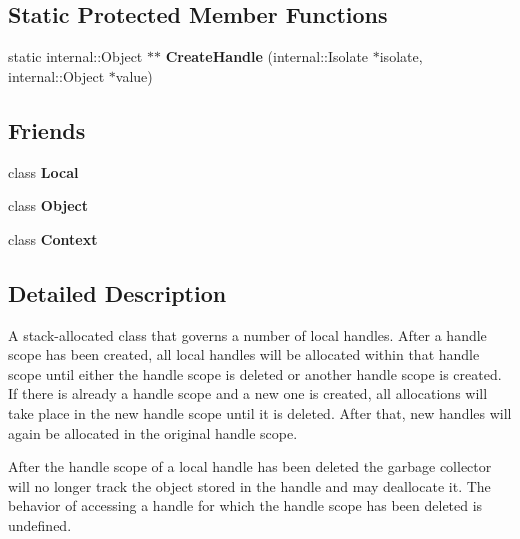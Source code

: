 \subsection*{Static Protected Member Functions}
\begin{DoxyCompactItemize}
\item 
\hypertarget{classv8_1_1HandleScope_a3f63aa8552a0371606305f58187d80e2}{static internal\-::\-Object $\ast$$\ast$ {\bfseries Create\-Handle} (internal\-::\-Isolate $\ast$isolate, internal\-::\-Object $\ast$value)}\label{classv8_1_1HandleScope_a3f63aa8552a0371606305f58187d80e2}

\end{DoxyCompactItemize}
\subsection*{Friends}
\begin{DoxyCompactItemize}
\item 
\hypertarget{classv8_1_1HandleScope_a0320da7f4056d4493dc1f8e49985d06e}{class {\bfseries Local}}\label{classv8_1_1HandleScope_a0320da7f4056d4493dc1f8e49985d06e}

\item 
\hypertarget{classv8_1_1HandleScope_a0720b5f434e636e22a3ed34f847eec57}{class {\bfseries Object}}\label{classv8_1_1HandleScope_a0720b5f434e636e22a3ed34f847eec57}

\item 
\hypertarget{classv8_1_1HandleScope_ac26c806e60ca4a0547680edb68f6e39b}{class {\bfseries Context}}\label{classv8_1_1HandleScope_ac26c806e60ca4a0547680edb68f6e39b}

\end{DoxyCompactItemize}


\subsection{Detailed Description}
A stack-\/allocated class that governs a number of local handles. After a handle scope has been created, all local handles will be allocated within that handle scope until either the handle scope is deleted or another handle scope is created. If there is already a handle scope and a new one is created, all allocations will take place in the new handle scope until it is deleted. After that, new handles will again be allocated in the original handle scope.

After the handle scope of a local handle has been deleted the garbage collector will no longer track the object stored in the handle and may deallocate it. The behavior of accessing a handle for which the handle scope has been deleted is undefined. 

